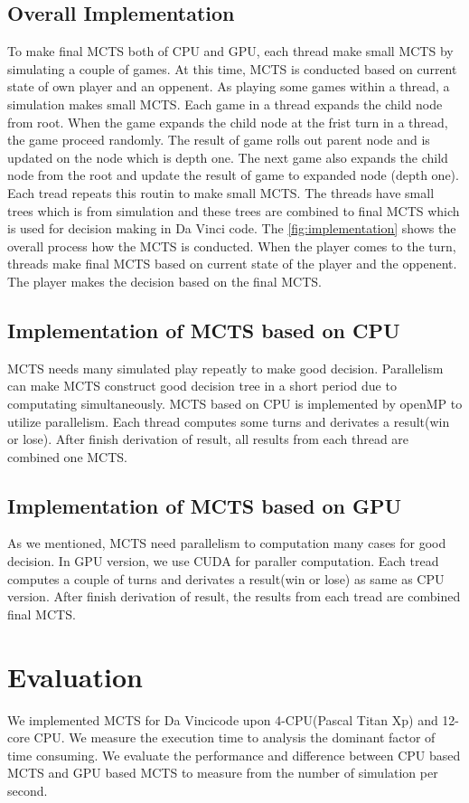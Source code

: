 \documentclass[conference]{IEEEtran}
\begin{document}
\subsection{Overall Implementation}
To make final MCTS both of CPU and GPU, each thread make small MCTS by simulating a couple of games.
At this time, MCTS is conducted based on current state of own player and an oppenent.
As playing some games within a thread, a simulation makes small MCTS.
Each game in a thread expands the child node from root. 
When the game expands the child node at the frist turn in a thread, the game proceed randomly. 
The result of game rolls out parent node and is updated on the node which is depth one. 
The next game also expands the child node from the root and update the result of game to expanded node (depth one).
Each tread repeats this routin to make small MCTS. 
The threads have small trees which is from simulation and these trees are combined to final MCTS which is used for decision making in Da Vinci code. 
The \cref{fig:implementation} shows the overall process how the MCTS is conducted.
When the player comes to the turn, threads make final MCTS based on current state of the player and the oppenent. 
The player makes the decision based on the final MCTS. 

\subsection{Implementation of MCTS based on CPU}
MCTS needs many simulated play repeatly to make good decision. 
Parallelism can make MCTS construct good decision tree in a short period due to computating simultaneously. 
MCTS based on CPU is implemented by openMP to utilize parallelism. Each thread computes some turns and derivates a result(win or lose). 
After finish derivation of result, all results from each thread are combined one MCTS.


\subsection{Implementation of MCTS based on GPU}
As we mentioned, MCTS need parallelism to computation many cases for good decision. 
In GPU version, we use CUDA for paraller computation. 
Each tread computes a couple of turns and derivates a result(win or lose) as same as CPU version. 
After finish derivation of result, the results from each tread are combined final MCTS. 


\section{Evaluation}
We implemented MCTS for Da Vincicode upon 4-CPU(Pascal Titan Xp) and 12-core CPU.
We measure the execution time to analysis the dominant factor of time consuming.
We evaluate the performance and difference between CPU based MCTS and GPU based MCTS to measure from the number of simulation per second.
\end{document}
